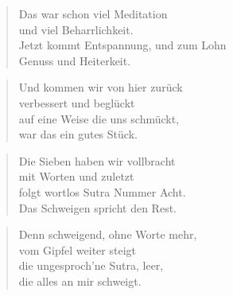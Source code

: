 \documentclass[10pt,a4paper]{article}
\begin{document}
\begin{paracol}{2}
\begin{verse}
Das war schon viel Meditation \\
und viel Beharrlichkeit. \\
Jetzt kommt Entspannung, und zum Lohn \\
Genuss und Heiterkeit. \\
\end{verse}

\begin{verse}
Und kommen wir von hier zurück \\
verbessert und beglückt \\
auf eine Weise die uns schmückt, \\
war das ein gutes Stück. \\
\end{verse}

\begin{verse}
Die Sieben haben wir vollbracht \\
mit Worten und zuletzt \\
folgt wortlos Sutra Nummer Acht. \\
Das Schweigen spricht den Rest. \\
\end{verse}

\begin{verse}
Denn schweigend, ohne Worte mehr, \\
vom Gipfel weiter steigt \\
die ungesproch’ne Sutra, leer, \\
die alles an mir schweigt. \\
\end{verse}

\end{paracol}

\end{document}
